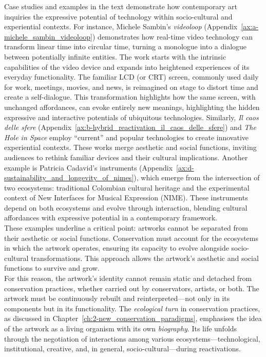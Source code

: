 Case studies and examples in the text demonstrate how contemporary art inquiries the expressive potential of technology within socio-cultural and experiential contexts. For instance, Michele Sambin’s \textit{videoloop} (Appendix~\ref{ax:a-michele_sambin_videoloop}) demonstrates how real-time video technology can transform linear time into circular time, turning a monologue into a dialogue between potentially infinite entities. The work starts with the intrinsic capabilities of the video device and expands into heightened experiences of its everyday functionality. The familiar LCD (or CRT) screen, commonly used daily for work, meetings, movies, and news, is reimagined on stage to distort time and create a self-dialogue. This transformation highlights how the same screen, with unchanged affordances, can evoke entirely new meanings, highlighting the hidden expressive and interactive potentials of ubiquitous technologies. Similarly, \textit{Il caos delle sfere} (Appendix~\ref{ax:b-hybrid_reactivation_il_caos_delle_sfere}) and \textit{The Hole in Space} employ ``current'' and popular technologies to create innovative experiential contexts. These works merge aesthetic and social functions, inviting audiences to rethink familiar devices and their cultural implications. Another example is Patricia Cadavid’s instruments (Appendix~\ref{ax:d-sustainability_and_longevity_of_nimes}), which emerge from the intersection of two ecosystems: traditional Colombian cultural heritage and the experimental context of New Interfaces for Musical Expression (NIME). These instruments depend on both ecosystems and evolve through interaction, blending cultural affordances with expressive potential in a contemporary framework.\\
These examples underline a critical point: artworks cannot be separated from their aesthetic or social functions. Conservation must account for the ecosystems in which the artwork operates, ensuring its capacity to evolve alongside socio-cultural transformations. This approach allows the artwork's aesthetic and social functions to survive and grow.\\
For this reason, the artwork's identity cannot remain static and detached from conservation practices, whether carried out by conservators, artists, or both. The artwork must be continuously rebuilt and reinterpreted—not only in its components but in its functionality. The \textit{ecological turn} in conservation practices, as discussed in Chapter~\ref{ch:2-new_conservation_paradigms}, emphasises the idea of the artwork as a living organism with its own \textit{biography}. Its life unfolds through the negotiation of interactions among various ecosystems—technological, institutional, creative, and, in general, socio-cultural—during reactivations.\\
